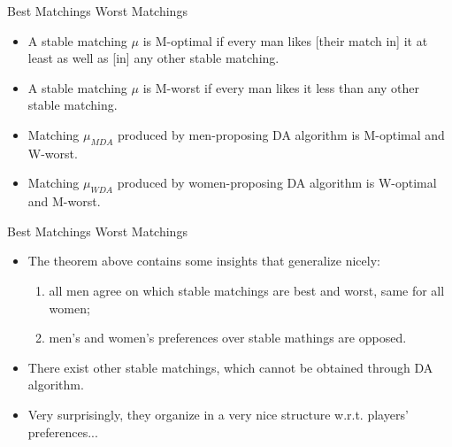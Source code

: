 \documentclass[english,10pt
,aspectratio=169
]{beamer}
\begin{document}
\begin{frame}{Best Matchings Worst Matchings}
\begin{definition}
	\begin{itemize}
		\item A stable matching \alert{$\mu$} is \alert{M-optimal} if every man  likes [their match in] it at least as well as [in] any other stable matching.
		
		\item A stable matching \alert{$\mu$} is \alert{M-worst} if every man  likes it less than any other stable matching.
	\end{itemize}
\end{definition}
\begin{theorem}
	\begin{itemize}
		\item Matching $\mu_{MDA}$ produced by men-proposing DA algorithm is M-optimal and W-worst.
		
		\item Matching $\mu_{WDA}$ produced by women-proposing DA algorithm is W-optimal and M-worst.
	\end{itemize}
\end{theorem}
\end{frame}


\begin{frame}{Best Matchings Worst Matchings}
\begin{itemize}
	\item The theorem above contains some insights that generalize nicely:
	\begin{enumerate}
		\item all men agree on which stable matchings are best and worst, same for all women;
		\item men's and women's preferences over stable mathings are opposed.
	\end{enumerate}
	\item There exist other stable matchings, which cannot be obtained through DA algorithm.
	\item Very surprisingly, they organize in a very nice  structure w.r.t. players' preferences...
\end{itemize}
\end{frame}
\end{document}
